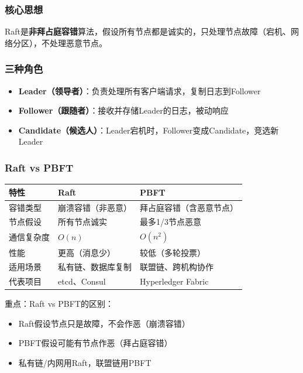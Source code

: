 ﻿\documentclass[12pt,a4paper]{article}
\begin{document}
\subsubsection{核心思想}

Raft是\textbf{非拜占庭容错}算法，假设所有节点都是诚实的，只处理节点故障（宕机、网络分区），不处理恶意节点。

\subsubsection{三种角色}

\begin{itemize}[leftmargin=1.5em]
\item \textbf{Leader（领导者）}：负责处理所有客户端请求，复制日志到Follower
\item \textbf{Follower（跟随者）}：接收并存储Leader的日志，被动响应
\item \textbf{Candidate（候选人）}：Leader宕机时，Follower变成Candidate，竞选新Leader
\end{itemize}

\subsubsection{Raft vs PBFT}

\begin{center}
\begin{tabular}{|l|p{5cm}|p{5cm}|}
\hline
\rowcolor{LightBG}
\textbf{特性} & \textbf{Raft} & \textbf{PBFT} \\
\hline
容错类型 & 崩溃容错（非恶意） & 拜占庭容错（含恶意节点） \\
\hline
节点假设 & 所有节点诚实 & 最多1/3节点恶意 \\
\hline
通信复杂度 & $O(n)$ & $O(n^2)$ \\
\hline
性能 & 更高（消息少） & 较低（多轮投票） \\
\hline
适用场景 & 私有链、数据库复制 & 联盟链、跨机构协作 \\
\hline
代表项目 & etcd、Consul & Hyperledger Fabric \\
\hline
\end{tabular}
\end{center}

\begin{keypointbox}
重点：Raft vs PBFT的区别：
\begin{itemize}
\item Raft假设节点只是故障，不会作恶（崩溃容错）
\item PBFT假设可能有节点作恶（拜占庭容错）
\item 私有链/内网用Raft，联盟链用PBFT
\end{itemize}
\end{keypointbox}
\end{document}

